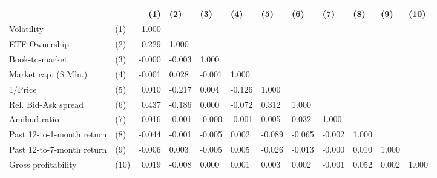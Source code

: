 \begin{tabular}{llrlllllllll}
\toprule
                    &      &    (1) &    (2) &    (3) &    (4) &    (5) &    (6) &    (7) &   (8) &   (9) &  (10) \\
\midrule
Volatility & (1) &  1.000 &        &        &        &        &        &        &       &       &       \\
ETF Ownership & (2) & -0.229 &  1.000 &        &        &        &        &        &       &       &       \\
Book-to-market & (3) & -0.000 & -0.003 &  1.000 &        &        &        &        &       &       &       \\
Market cap. (\$ Mln.) & (4) & -0.001 &  0.028 & -0.001 &  1.000 &        &        &        &       &       &       \\
1/Price & (5) &  0.010 & -0.217 &  0.004 & -0.126 &  1.000 &        &        &       &       &       \\
Rel. Bid-Ask spread & (6) &  0.437 & -0.186 &  0.000 & -0.072 &  0.312 &  1.000 &        &       &       &       \\
Amihud ratio & (7) &  0.016 & -0.001 & -0.000 & -0.001 &  0.005 &  0.032 &  1.000 &       &       &       \\
Past 12-to-1-month return & (8) & -0.044 & -0.001 & -0.005 &  0.002 & -0.089 & -0.065 & -0.002 & 1.000 &       &       \\
Past 12-to-7-month return & (9) & -0.006 &  0.003 & -0.005 &  0.005 & -0.026 & -0.013 & -0.000 & 0.010 & 1.000 &       \\
Gross profitability & (10) &  0.019 & -0.008 &  0.000 &  0.001 &  0.003 &  0.002 & -0.001 & 0.052 & 0.002 & 1.000 \\
\bottomrule
\end{tabular}
